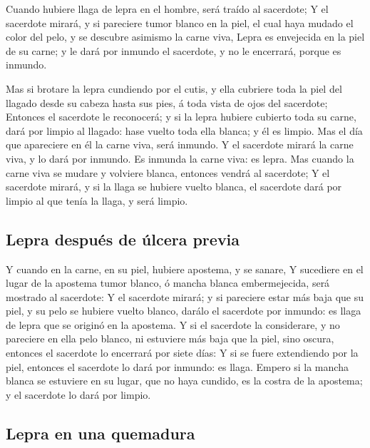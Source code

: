  Cuando hubiere llaga de lepra en el hombre, será traído
al sacerdote;  Y el sacerdote mirará, y si pareciere
tumor blanco en la piel, el cual haya mudado el color del pelo, y se
descubre asimismo la carne viva,  Lepra es envejecida en
la piel de su carne; y le dará por inmundo el sacerdote, y no le
encerrará, porque es inmundo.

 Mas si brotare la lepra cundiendo por el cutis, y ella
cubriere toda la piel del llagado desde su cabeza hasta sus pies, á toda
vista de ojos del sacerdote;  Entonces el sacerdote le
reconocerá; y si la lepra hubiere cubierto toda su carne, dará por
limpio al llagado: hase vuelto toda ella blanca; y él es limpio.
 Mas el día que apareciere en él la carne viva, será
inmundo.  Y el sacerdote mirará la carne viva, y lo dará
por inmundo. Es inmunda la carne viva: es lepra.  Mas
cuando la carne viva se mudare y volviere blanca, entonces vendrá al
sacerdote;  Y el sacerdote mirará, y si la llaga se
hubiere vuelto blanca, el sacerdote dará por limpio al que tenía la
llaga, y será limpio.

\hypertarget{lepra-despuuxe9s-de-uxfalcera-previa}{%
\subsection{Lepra después de úlcera
previa}\label{lepra-despuuxe9s-de-uxfalcera-previa}}

 Y cuando en la carne, en su piel, hubiere apostema, y se
sanare,  Y sucediere en el lugar de la apostema tumor
blanco, ó mancha blanca embermejecida, será mostrado al sacerdote:
 Y el sacerdote mirará; y si pareciere estar más baja que
su piel, y su pelo se hubiere vuelto blanco, darálo el sacerdote por
inmundo: es llaga de lepra que se originó en la apostema.
 Y si el sacerdote la considerare, y no pareciere en ella
pelo blanco, ni estuviere más baja que la piel, sino oscura, entonces el
sacerdote lo encerrará por siete días:  Y si se fuere
extendiendo por la piel, entonces el sacerdote lo dará por inmundo: es
llaga.  Empero si la mancha blanca se estuviere en su
lugar, que no haya cundido, es la costra de la apostema; y el sacerdote
lo dará por limpio.

\hypertarget{lepra-en-una-quemadura}{%
\subsection{Lepra en una quemadura}\label{lepra-en-una-quemadura}}

